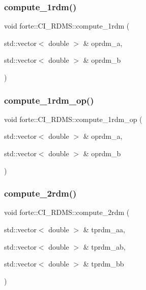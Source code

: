 \subsubsection{\texorpdfstring{compute\+\_\+1rdm()}{compute\_1rdm()}}
{\footnotesize\ttfamily void forte\+::\+C\+I\+\_\+\+R\+D\+M\+S\+::compute\+\_\+1rdm (\begin{DoxyParamCaption}\item[{std\+::vector$<$ double $>$ \&}]{oprdm\+\_\+a,  }\item[{std\+::vector$<$ double $>$ \&}]{oprdm\+\_\+b }\end{DoxyParamCaption})}

\mbox{\label{classforte_1_1_c_i___r_d_m_s_ad232dbb35aa59e9edcdc86626d3a883d}} 
\subsubsection{\texorpdfstring{compute\+\_\+1rdm\+\_\+op()}{compute\_1rdm\_op()}}
{\footnotesize\ttfamily void forte\+::\+C\+I\+\_\+\+R\+D\+M\+S\+::compute\+\_\+1rdm\+\_\+op (\begin{DoxyParamCaption}\item[{std\+::vector$<$ double $>$ \&}]{oprdm\+\_\+a,  }\item[{std\+::vector$<$ double $>$ \&}]{oprdm\+\_\+b }\end{DoxyParamCaption})}

\mbox{\label{classforte_1_1_c_i___r_d_m_s_ab881ee2d8f370683a18b6659c542e868}} 
\subsubsection{\texorpdfstring{compute\+\_\+2rdm()}{compute\_2rdm()}}
{\footnotesize\ttfamily void forte\+::\+C\+I\+\_\+\+R\+D\+M\+S\+::compute\+\_\+2rdm (\begin{DoxyParamCaption}\item[{std\+::vector$<$ double $>$ \&}]{tprdm\+\_\+aa,  }\item[{std\+::vector$<$ double $>$ \&}]{tprdm\+\_\+ab,  }\item[{std\+::vector$<$ double $>$ \&}]{tprdm\+\_\+bb }\end{DoxyParamCaption})}

